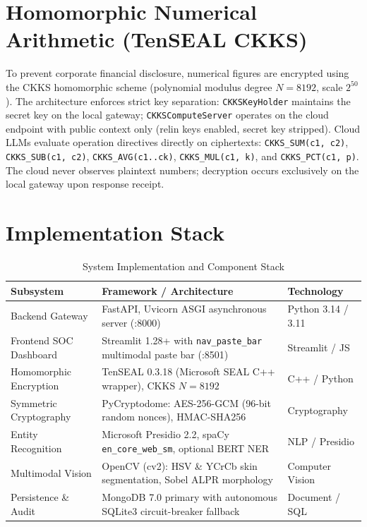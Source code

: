 \documentclass[10pt,a4paper]{article}
\begin{document}
\section{Homomorphic Numerical Arithmetic (TenSEAL CKKS)}
To prevent corporate financial disclosure, numerical figures are encrypted using the CKKS homomorphic scheme (polynomial modulus degree $N=8192$, scale $2^{50}$). The architecture enforces strict key separation: \texttt{CKKSKeyHolder} maintains the secret key on the local gateway; \texttt{CKKSComputeServer} operates on the cloud endpoint with public context only (relin keys enabled, secret key stripped). Cloud LLMs evaluate operation directives directly on ciphertexts: \texttt{CKKS\_SUM(c1, c2)}, \texttt{CKKS\_SUB(c1, c2)}, \texttt{CKKS\_AVG(c1..ck)}, \texttt{CKKS\_MUL(c1, k)}, and \texttt{CKKS\_PCT(c1, p)}. The cloud never observes plaintext numbers; decryption occurs exclusively on the local gateway upon response receipt.

\section{Implementation Stack}
\begin{table}[h]
\centering
\small
\begin{tabular}{p{}p{}p{}}
\toprule
\textbf{Subsystem} & \textbf{Framework / Architecture} & \textbf{Technology} \\
\midrule
Backend Gateway & FastAPI, Uvicorn ASGI asynchronous server (:8000) & Python 3.14 / 3.11 \\
Frontend SOC Dashboard & Streamlit 1.28+ with \texttt{nav\_paste\_bar} multimodal paste bar (:8501) & Streamlit / JS \\
Homomorphic Encryption & TenSEAL 0.3.18 (Microsoft SEAL C++ wrapper), CKKS $N=8192$ & C++ / Python \\
Symmetric Cryptography & PyCryptodome: AES-256-GCM (96-bit random nonces), HMAC-SHA256 & Cryptography \\
Entity Recognition & Microsoft Presidio 2.2, spaCy \texttt{en\_core\_web\_sm}, optional BERT NER & NLP / Presidio \\
Multimodal Vision & OpenCV (cv2): HSV \& YCrCb skin segmentation, Sobel ALPR morphology & Computer Vision \\
Persistence \& Audit & MongoDB 7.0 primary with autonomous SQLite3 circuit-breaker fallback & Document / SQL \\
\bottomrule
\end{tabular}
\caption{System Implementation and Component Stack}
\end{table}
\end{document}
